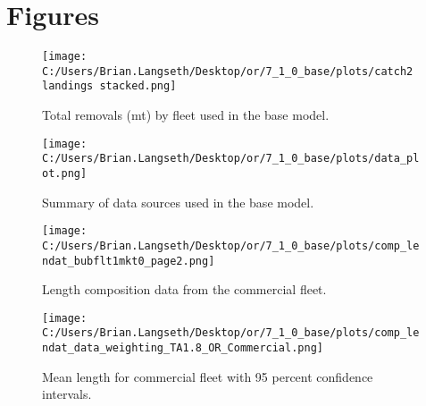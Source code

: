 \documentclass[11pt,
  english,
  a4paper,
]{article}
\begin{document}
\newpage

\clearpage


\hypertarget{figures}{%
\section{Figures}\label{figures}}

\leavevmode\tagmcend\tagstructend


\begin{figure}
\centering
\texttt{[image: C:/Users/Brian.Langseth/Desktop/or/7\_1\_0\_base/plots/catch2 landings stacked.png]}
\caption{Total removals (mt) by fleet used in the base model.\label{fig:catch}}
\end{figure}

\tagmcend\tagstructend


\begin{figure}
\centering
\texttt{[image: C:/Users/Brian.Langseth/Desktop/or/7\_1\_0\_base/plots/data\_plot.png]}
\caption{Summary of data sources used in the base model.\label{fig:data-plot}}
\end{figure}

\tagmcend\tagstructend


\begin{figure}
\centering
\texttt{[image: C:/Users/Brian.Langseth/Desktop/or/7\_1\_0\_base/plots/comp\_lendat\_bubflt1mkt0\_page2.png]}
\caption{Length composition data from the commercial fleet.\label{fig:com-len-data}}
\end{figure}

\tagmcend\tagstructend


\begin{figure}
\centering
\texttt{[image: C:/Users/Brian.Langseth/Desktop/or/7\_1\_0\_base/plots/comp\_lendat\_data\_weighting\_TA1.8\_OR\_Commercial.png]}
\caption{Mean length for commercial fleet with 95 percent confidence intervals.\label{fig:mean-com-len-data}}
\end{figure}
\end{document}
